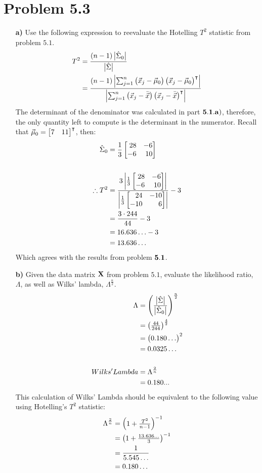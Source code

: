 \newpage
\section*{Problem 5.3}
\begin{enumerate}
\item[\bf{a)}] Use the following expression to reevaluate the Hotelling $T^2$ statistic from problem $5.1$.
	\begin{align*}
		T^2 &= \frac{(n-1)\md{\hat{\Sigma}_0}}{\md{\hat{\Sigma}}} \\
				&=\frac{(n-1)\md{\sum_{j=1}^n\p{\vec{x}_j-\vec{\mu}_0}\p{\vec{x}_j-\vec{\mu}_0}^{\intercal}}}{\md{\sum_{j=1}^n\p{\vec{x}_j-\bar{\vec{x}}}\p{\vec{x}_j-\bar{\vec{x}}}^{\intercal}}}
	\end{align*}
	The determinant of the denominator was calculated in part $\bf{5.1.a)}$, therefore, the only quantity left to compute is the determinant in the numerator. Recall that $\vec{\mu}_0 = \m{7 & 11}^{\intercal}$, then:
	\begin{align*}
		\hat{\Sigma}_0 &= \frac{1}{3} \m{28 & -6 \\ -6 & 10} \\
		\\
		\therefore T^2 &= \frac{3 \md{\frac{1}{3} \m{28 & -6 \\ -6 & 10}}}{\md{\frac{1}{3} \m{24 & -10 \\ -10 & 6}}} - 3\\
									 &= \frac{3 \cdot 244}{44} - 3 \\
									 &= 16.636 \ldots - 3 \\
									 &= 13.636 \ldots
	\end{align*}
	Which agrees with the results from problem $\bf{5.1}$.

\item[\bf{b)}] Given the data matrix $\mathrm{\bf{X}}$ from problem $5.1$, evaluate the likelihood ratio, $\Lambda$, as well as Wilks' lambda, $\Lambda^{\frac{n}{2}}$.
	\begin{align*}
		\Lambda &= \p{\frac{\md{\hat{\Sigma}}}{\md{\hat{\Sigma}_0}}}^{\frac{n}{2}} \\
						&= \p{\frac{44}{244}}^{\frac{4}{2}} \\
						&= \p{0.180 \ldots}^2 \\
						&= 0.0325 \ldots \\
		\\
		Wilks' Lambda &= \Lambda^{\frac{2}{n}} \\
									&= 0.180...
	\end{align*}
	This calculation of Wilks' Lambda should be equivalent to the following value using Hotelling's $T^2$ statistic:
	\begin{align*}
		\Lambda^{\frac{2}{n}} &= \begin{pmatrix}1 + \frac{T^2}{n-1}\end{pmatrix}^{-1} \\
													&= \begin{pmatrix}1 + \frac{13.636 \ldots}{3}\end{pmatrix}^{-1} \\
													&= \frac{1}{5.545 \ldots} \\
													&= 0.180 \ldots
	\end{align*}

\end{enumerate}

